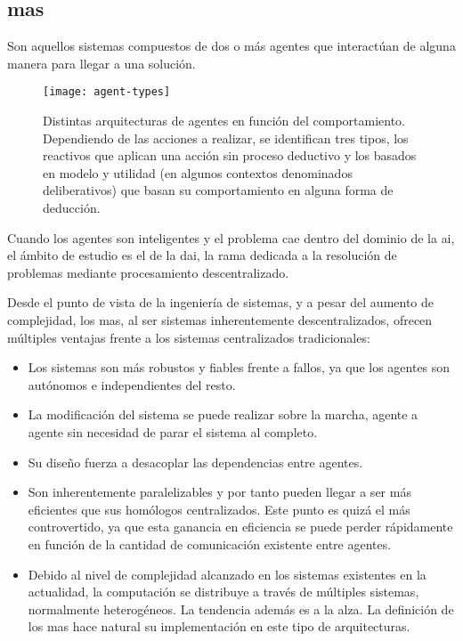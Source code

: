 \subsection{\gls{mas}}

Son aquellos sistemas compuestos de dos o más agentes que interactúan de alguna manera para llegar a una solución.

\begin{figure}[t]
	\texttt{[image: agent-types]}
	\caption[Arquitecturas de agente según su comportamiento.]{Distintas arquitecturas de agentes en función del comportamiento. Dependiendo de las acciones a realizar, se identifican tres tipos, los reactivos que aplican una acción sin proceso deductivo y los basados en modelo y utilidad (en algunos contextos denominados deliberativos) que basan su comportamiento en alguna forma de deducción.}
	\label{fig:agent-types}
\end{figure}

Cuando los agentes son inteligentes y el problema cae dentro del dominio de la \gls{ai}, el ámbito de estudio es el de la \gls{dai}, la rama dedicada a la resolución de problemas mediante procesamiento descentralizado.

Desde el punto de vista de la ingeniería de sistemas, y a pesar del aumento de complejidad, los \gls{mas}, al ser sistemas inherentemente descentralizados, ofrecen múltiples ventajas frente a los sistemas centralizados tradicionales:

\begin{itemize}
	\item Los sistemas son más robustos y fiables frente a fallos, ya que los agentes son autónomos e independientes del resto.
	\item La modificación del sistema se puede realizar sobre la marcha, agente a agente sin necesidad de parar el sistema al completo.
	\item Su diseño fuerza a desacoplar las dependencias entre agentes.
	\item Son inherentemente paralelizables y por tanto pueden llegar a ser más eficientes que sus homólogos centralizados. Este punto es quizá el más controvertido, ya que esta ganancia en eficiencia se puede perder rápidamente en función de la cantidad de comunicación existente entre agentes.
	\item Debido al nivel de complejidad alcanzado en los sistemas existentes en la actualidad, la computación se distribuye a través de múltiples sistemas, normalmente heterogéneos. La tendencia además es a la alza. La definición de los \gls{mas} hace natural su implementación en este tipo de arquitecturas.
\end{itemize}


